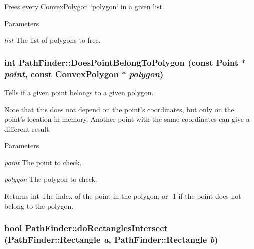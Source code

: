 Frees every ConvexPolygon \char`\"{}polygon\char`\"{} in a given list. 


\begin{DoxyParams}{Parameters}
\item[{\em list}]The list of polygons to free. \end{DoxyParams}
\hypertarget{classPathFinder_ad12ed53e6e67ee4408a757bbca18058d}{
\subsubsection[{DoesPointBelongToPolygon}]{\setlength{\rightskip}{0pt plus 5cm}int PathFinder::DoesPointBelongToPolygon (const {\bf Point} $\ast$ {\em point}, \/  const {\bf ConvexPolygon} $\ast$ {\em polygon})}}
\label{classPathFinder_ad12ed53e6e67ee4408a757bbca18058d}


Tells if a given \hyperlink{structPathFinder_1_1Point}{point} belongs to a given \hyperlink{structPathFinder_1_1ConvexPolygon}{polygon}. 

Note that this does not depend on the point's coordinates, but only on the point's location in memory. Another point with the same coordinates can give a different result.


\begin{DoxyParams}{Parameters}
\item[{\em point}]The point to check. \item[{\em polygon}]The polygon to check. \end{DoxyParams}
\begin{DoxyReturn}{Returns}
int The index of the point in the polygon, or -\/1 if the point does not belong to the polygon. 
\end{DoxyReturn}
\hypertarget{classPathFinder_af0e8090b3bb9516751093f99a7376453}{
\subsubsection[{doRectanglesIntersect}]{\setlength{\rightskip}{0pt plus 5cm}bool PathFinder::doRectanglesIntersect ({\bf PathFinder::Rectangle} {\em a}, \/  {\bf PathFinder::Rectangle} {\em b})}}
\label{classPathFinder_af0e8090b3bb9516751093f99a7376453}



